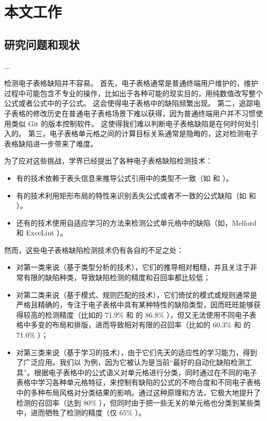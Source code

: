 \section{本文工作}

\subsection{研究问题和现状}

...


检测电子表格缺陷并不容易。
首先，电子表格通常是普通终端用户维护的，维护过程中可能包含不专业的操作，比如出于各种可能的现实目的，用纯数值改写整个公式或者公式中的子公式。
这会使得电子表格中的缺陷频繁出现。
第二，追踪电子表格的修改历史在普通电子表格场景下难以获得，因为普通终端用户并不习惯使用类似 Git 的版本控制软件。
这使得我们难以判断电子表格缺陷是在何时何处引入的。
第三，电子表格单元格之间的计算目标关系通常是隐晦的，这对检测电子表格缺陷进一步带来了难度。

为了应对这些挑战，学界已经提出了各种电子表格缺陷检测技术：

\begin{itemize}
    \item 有的技术依赖于表头信息来推导公式引用中的类型不一致（如\uc \cite{abraham2007ucheck} 和 \di \cite{chambers2009automatic}）。
    \item 有的技术利用矩形布局的特性来识别丢失公式或者不一致的公式缺陷（如\am \cite{dou2014spreadsheet} 和 \ca \cite{dou2017cacheck}）。
    \item 还有的技术使用自适应学习的方法来检测公式单元格中的缺陷（如\cu \cite{cheung2016custodes}，Melford\cite{singh2017melford} 和 ExceLint \cite{Barowy2018excelint}）。
\end{itemize}


然而，这些电子表格缺陷检测技术仍有各自的不足之处：

\begin{itemize}
    \item 对第一类来说（基于类型分析的技术），它们的推导相对粗糙，并且关注于非常有限的缺陷种类，导致缺陷检测的精度和召回率都比较低\cite{zhang2017effectively}；
    \item 对第二类来说（基于模式、规则匹配的技术），它们倚仗的模式或规则通常是严格且精确的，专注于电子表格中具有某种特性的缺陷类型，因而旺旺能够获得较高的检测精度（比如\am 的 71.9\% 和 \ca 的 86.8\% \cite{dou2017cacheck}），但又无法使用不同电子表格中多变的布局和排版，进而导致相对有限的召回率（比如\am 的 60.3\% 和 \ca 的 71.0\% \cite{dou2017cacheck}）；
    \item 对第三类来说（基于学习的技术），由于它们先天的适应性的学习能力，得到了广泛应用。我们以 \cu \cite{cheung2016custodes} 为例，因为它被认为是当前“最好的自动化缺陷检测工具”\cite{Barowy2018excelint}。\cu 根据电子表格中的公式语义对单元格进行分类，同时通过在不同的电子表格中学习各种单元格特征，来控制有缺陷的公式的不吻合度和不同电子表格中的多种布局风格对分类结果的影响。通过这种原理和方法，它极大地提升了检测的召回率（达到 80\% \cite{cheung2016custodes}），但同时由于把一些无关的单元格也分类到某些类中，进而牺牲了检测的精度（仅 65\% \cite{cheung2016custodes}）。
\end{itemize}

